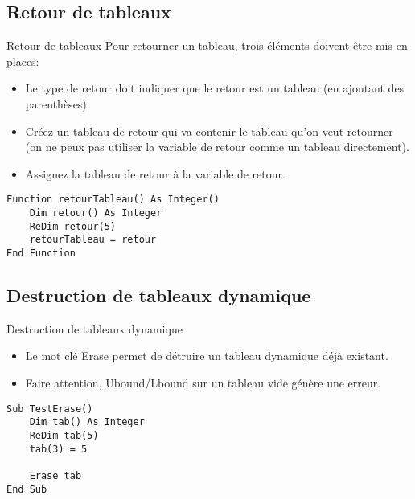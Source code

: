 \documentclass[aspectratio=169,usenames,dvipsnames]{beamer}
\begin{document}
    \subsection{Retour de tableaux}
    \begin{frame}[fragile]{Retour de tableaux}
    Pour retourner un tableau, trois éléments doivent être mis en places:
        \begin{itemize}
            \item Le type de retour doit indiquer que le retour est un tableau (en ajoutant des parenthèses).
            \item Créez un tableau de retour qui va contenir le tableau qu’on veut retourner (on ne peux pas utiliser la variable de retour comme un tableau directement).
            \item Assignez la tableau de retour à la variable de retour.
        \end{itemize}
\begin{lstlisting}
Function retourTableau() As Integer()
    Dim retour() As Integer
    ReDim retour(5)
    retourTableau = retour
End Function
\end{lstlisting} 
    \end{frame}
    \subsection{Destruction de tableaux dynamique}
    \begin{frame}[fragile]{Destruction de tableaux dynamique}
        \begin{itemize}
            \item Le mot clé \alert{Erase} permet de détruire un tableau dynamique déjà existant.
            \item Faire attention, Ubound/Lbound sur un tableau vide génère une erreur.
        \end{itemize}
\begin{lstlisting}
Sub TestErase()
    Dim tab() As Integer
    ReDim tab(5)
    tab(3) = 5
    
    Erase tab
End Sub
\end{lstlisting} 
    \end{frame}
\end{document}
